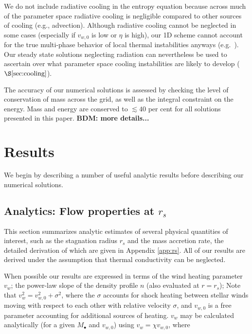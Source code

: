 \documentclass[usenatbib,fleqn]{mn2e}
\newcommand{\rs}{r_s}
\newcommand{\vw}{v_w}
\newcommand{\Mbh}[1][]{M_{\bullet#1}}
\newcommand{\vwO}{v_{w,0}}
\begin{document}
We do not include radiative cooling in the entropy equation because
across much of the parameter space radiative cooling is negligible
compared to other sources of cooling (e.g., advection).  Although
radiative cooling cannot be neglected in some cases (especially if
$\vwO$ is low or $\eta$ is high), our 1D scheme cannot account for the
true multi-phase behavior of local thermal instabilities anyways
(e.g.~\citealt{McCourt+12}).  Our steady state solutions neglecting
radiation can nevertheless be used to ascertain over what parameter
space cooling instabilities are likely to develop
($\S\ref{sec:cooling}$).

The accuracy of our numerical solutions is assessed by checking the
level of conservation of mass across the grid, as well as the integral
constraint on the energy.  Mass and energy are conserved to $\lesssim
40$ per cent for all solutions presented in this
paper. 
{\bf BDM: more details...}


\section{Results}

We begin by describing a number of useful analytic results before describing our numerical solutions.  

\label{sec:results}
\subsection{Analytics: Flow properties at $\rs$}

This section summarizes analytic estimates of several physical
quantities of interest, such as the stagnation radius $\rs$ and the
mass accretion rate, the detailed derivation of which are given in
Appendix \ref{app:rs}.  All of our results are derived under the
assumption that thermal conductivity can be neglected.

When possible our results are expressed in terms of the wind heating
parameter $\vw$; the power-law slope of the density profile
$n$ (also evaluated at $r = \rs$); Note that $\vw^2=\vwO^2+\sigma^2$,
where the $\sigma$ accounts for shock heating between stellar winds moving
with respect to each other with relative velocity $\sigma$, and $\vwO$
is a free parameter accounting for additional sources of
heating.  $\vw$ may be calculated analytically (for a given $\Mbh$ and
$\vwO$) using $\vw=\chi \vwO$, where
\end{document}
